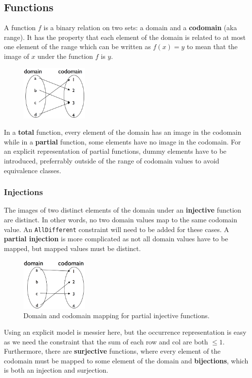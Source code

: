 \documentclass[CS4402-Notes.tex]{subfiles}
\begin{document}
\subsection{Functions}
A function $f$ is a binary relation on two sets: a domain and a \textbf{codomain} (aka range). It has the property that each element of the domain is related to at most one element of the range which can be written as $f(x) = y$ to mean that the image of $x$ under the function $f$ is $y$.
\begin{figure}[H]
\centering
\includegraphics[width=0.3\textwidth, keepaspectratio]{imgs/function.png}
\end{figure}
\noindent
In a \textbf{total} function, every element of the domain has an image in the codomain while in a \textbf{partial} function, some elements have no image in the codomain. For an explicit representation of partial functions, dummy elements have to be introduced, preferrably outside of the range of codomain values to avoid equivalence classes.

\subsubsection{Injections}
The images of two distinct elements of the domain under an \textbf{injective} function are distinct. In other words, no two domain values map to the same codomain value. An \texttt{AllDifferent} constraint will need to be added for these cases.
\n
A \textbf{partial injection} is more complicated as not all domain values have to be mapped, but mapped values must be distinct.
\begin{figure}[H]
\centering
\includegraphics[width=0.3\textwidth, keepaspectratio]{imgs/partial-injective-function.png}
\caption{Domain and codomain mapping for partial injective functions.}
\end{figure}
\noindent
Using an explicit model is messier here, but the occurrence representation is easy as we need the constraint that the sum of each row and col are both $\leq 1$.
\n
Furthermore, there are \textbf{surjective} functions, where every element of the codomain must be mapped to some element of the domain and \textbf{bijections}, which is both an injection and surjection. 
\end{document}
